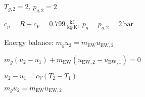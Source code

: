 \( T_{g,2} = 2, \, p_{g,2} = 2 \)  

\( c_{p} = R + c_{V} = 0.799 \, \frac{\text{kJ}}{\text{kg·K}}, \, p_{g} = p_{g,2} = 2 \, \text{bar} \)  

Energy balance:  
\( m_{g} u_{2} = m_{\text{EW}} u_{\text{EW},2} \)  

\( m_{g} (u_{2} - u_{1}) + m_{\text{EW}} (u_{\text{EW},2} - u_{\text{EW},1}) = 0 \)  

\( u_{2} - u_{1} = c_{V} (T_{2} - T_{1}) \)  

\( m_{g} u_{2} = m_{\text{EW}} u_{\text{EW},2} \)